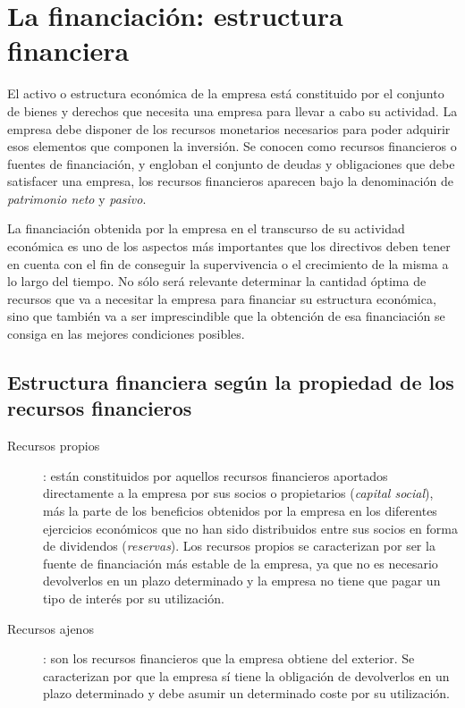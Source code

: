 \documentclass[10pt,a4paper,spanish]{report}
\begin{document}
      \section{\textcolor[rgb]{0.4,0.7,0.4}La financiación: estructura financiera}

            El activo o estructura económica de la empresa está constituido por el conjunto de bienes y derechos que necesita una empresa para llevar a cabo su actividad. La empresa debe disponer de los recursos monetarios necesarios para poder adquirir esos elementos que componen la inversión. Se conocen como recursos financieros o fuentes de financiación, y engloban el conjunto de deudas y obligaciones que debe satisfacer una empresa, los recursos financieros aparecen bajo la denominación de \textit{\textcolor[rgb]{0.4,0.7,0.4}{patrimonio neto}} y \textit{\textcolor[rgb]{0.4,0.7,0.4}{pasivo}}.

            La financiación obtenida por la empresa en el transcurso de su actividad económica es uno de los aspectos más importantes que los directivos deben tener en cuenta con el fin de conseguir la supervivencia o el crecimiento de la misma a lo largo del tiempo. No sólo será relevante determinar la cantidad óptima de recursos que va a necesitar la empresa para financiar su estructura económica, sino que también va a ser imprescindible que la obtención de esa financiación se consiga en las mejores condiciones posibles.

            \subsection{\textcolor[rgb]{0.4,0.7,0.4}Estructura financiera según la propiedad de los recursos financieros}

                  \begin{description}
                        \item[Recursos propios]: están constituidos por aquellos recursos financieros aportados directamente a la empresa por sus socios o propietarios (\textit{\textcolor[rgb]{0.4,0.7,0.4}{capital social}}), más la parte de los beneficios obtenidos por la empresa en los diferentes ejercicios económicos que no han sido distribuidos entre sus socios en forma de dividendos (\textit{\textcolor[rgb]{0.4,0.7,0.4}{reservas}}). Los recursos propios se caracterizan por ser la fuente de financiación más estable de la empresa, ya que no es necesario devolverlos en un plazo determinado y la empresa no tiene que pagar un tipo de interés por su utilización.
                        \item[Recursos ajenos]: son los recursos financieros que la empresa obtiene del exterior. Se caracterizan por que la empresa sí tiene la obligación de devolverlos en un plazo determinado y debe asumir un determinado coste por su utilización.
                  \end{description}
\end{document}
